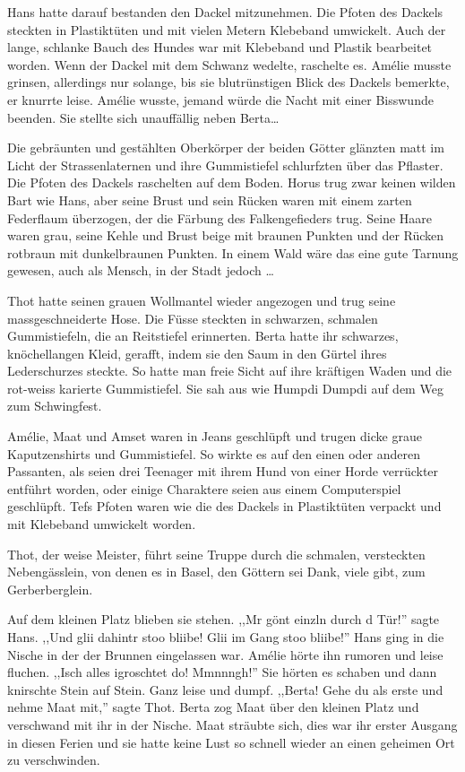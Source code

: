 \documentclass[11pt,titlepage,a5paper]{book}
\newcommand{\am}{Amélie }
\begin{document}
Hans hatte darauf bestanden den Dackel mitzunehmen. Die Pfoten des Dackels steckten in Plastiktüten und mit vielen Metern Klebeband umwickelt. Auch der lange, schlanke Bauch des Hundes war mit Klebeband und Plastik bearbeitet worden. Wenn der Dackel mit dem Schwanz wedelte, raschelte es. \am musste grinsen, allerdings nur solange, bis sie blutrünstigen Blick des Dackels bemerkte, er knurrte leise. \am wusste, jemand würde die Nacht mit einer Bisswunde beenden. Sie stellte sich unauffällig neben Berta\dots

Die gebräunten und gestählten Oberkörper der beiden Götter glänzten matt im Licht der Strassenlaternen und ihre Gummistiefel  schlurfzten über das Pflaster. Die Pfoten des Dackels raschelten auf dem Boden. Horus trug zwar keinen wilden Bart wie Hans, aber seine Brust und sein Rücken waren mit einem zarten Federflaum überzogen, der die Färbung des Falkengefieders trug. Seine Haare waren grau, seine Kehle und Brust beige mit braunen Punkten und der Rücken rotbraun mit dunkelbraunen Punkten. In einem Wald wäre das eine gute Tarnung gewesen, auch als Mensch, in der Stadt jedoch \dots

Thot hatte seinen grauen Wollmantel wieder angezogen und trug seine massgeschneiderte Hose. Die Füsse steckten in schwarzen, schmalen Gummistiefeln, die an Reitstiefel erinnerten. Berta hatte ihr schwarzes, knöchellangen Kleid, gerafft, indem sie den Saum in den Gürtel ihres Lederschurzes steckte. So hatte man freie Sicht auf ihre kräftigen Waden und die rot-weiss karierte Gummistiefel. Sie sah aus wie Humpdi Dumpdi auf dem Weg zum Schwingfest.

 Amélie, Maat und Amset waren in Jeans geschlüpft und trugen dicke graue Kaputzenshirts und Gummistiefel. So wirkte es auf den einen oder anderen Passanten, als seien drei Teenager mit ihrem Hund von einer Horde verrückter entführt worden, oder einige Charaktere seien aus einem Computerspiel geschlüpft. Tefs Pfoten waren wie die des Dackels in Plastiktüten verpackt und mit Klebeband umwickelt worden.

Thot, der weise Meister, führt seine Truppe durch die schmalen, versteckten Nebengässlein, von denen es in Basel, den Göttern sei Dank, viele gibt, zum Gerberberglein.

Auf dem kleinen Platz blieben sie stehen. ,,Mr gönt einzln durch d Tür!'' sagte Hans. ,,Und glii dahintr stoo bliibe! Glii im Gang stoo bliibe!'' Hans ging in die Nische in der der Brunnen eingelassen war. Amélie hörte ihn rumoren und leise fluchen. ,,Isch alles igroschtet do! Mmnnngh!'' Sie hörten es schaben und dann knirschte Stein auf Stein. Ganz leise und dumpf. ,,Berta! Gehe du als erste und nehme Maat mit,'' sagte Thot. Berta zog Maat über den kleinen Platz und verschwand mit ihr in der Nische. Maat sträubte sich, dies war ihr erster Ausgang in diesen Ferien und sie hatte keine Lust so schnell wieder an einen geheimen Ort zu verschwinden.
\end{document}
